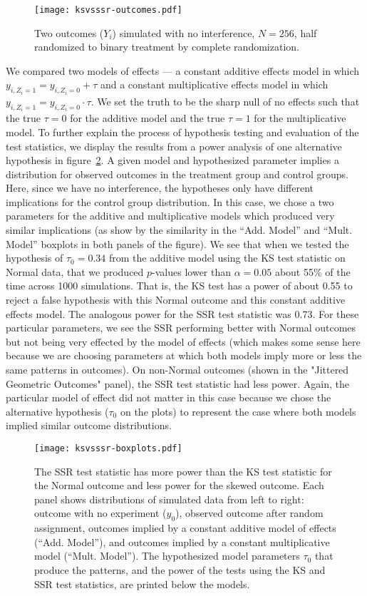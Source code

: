 \begin{figure}[H]\centering
  \texttt{[image: ksvsssr-outcomes.pdf]}
  \caption{Two outcomes ($Y_i$) simulated with no interference, $N=256$, half
    randomized to binary treatment by complete randomization. }\label{fig:simpleoutcomes}
\end{figure}

We compared two models of effects --- a constant additive effects model in
which $y_{i,Z_i=1}=y_{i,Z_i=0}+\tau$ and a constant multiplicative effects
model in which $y_{i,Z_i=1}=y_{i,Z_i=0} \cdot \tau$. We set the truth to be
the sharp null of no effects such that the true $\tau=0$ for the additive
model and the true $\tau=1$ for the multiplicative model. To further explain
the process of hypothesis testing and evaluation of the test statistics, we
display the results from a power analysis of one alternative hypothesis in
figure~\ref{fig:boxplot}. A given model and hypothesized parameter implies a
distribution for observed outcomes in the treatment group and control groups.
Here, since we have no interference, the hypotheses only have different
implications for the control group distribution. In this case, we chose a two
parameters for the additive and multiplicative models which produced very
similar implications (as show by the similarity in the ``Add. Model'' and
``Mult.  Model'' boxplots in both panels of the figure). We see that when we
tested the hypothesis of $\tau_0=0.34$ from the additive model using the KS
test statistic on Normal data, that we produced $p$-values lower than
$\alpha=0.05$ about 55\% of the time across 1000 simulations. That is, the KS
test has a power of about 0.55 to reject a false hypothesis with this Normal
outcome and this constant additive effects model. The analogous power for the
SSR test statistic was 0.73. For these particular parameters, we see the SSR
performing better with Normal outcomes but not being very effected by the
model of effects (which makes some sense here because we are choosing
parameters at which both models imply more or less the same patterns in
outcomes). On non-Normal outcomes (shown in the "Jittered Geometric Outcomes"
panel), the SSR test statistic had less power. Again, the particular model of
effect did not matter in this case because we chose the alternative hypothesis
($\tau_0$ on the plots) to represent the case where both models implied
similar outcome distributions.

\begin{figure}[H]\centering
  \texttt{[image: ksvsssr-boxplots.pdf]}
  \caption{The SSR test statistic has more power than the KS test statistic for the Normal outcome and
    less power for the skewed outcome. Each panel shows distributions of simulated data from left to right:
    outcome with no experiment ($y_0$), observed outcome after random assignment,
    outcomes implied by a constant additive model of effects (``Add. Model''),
    and outcomes implied by a constant multiplicative model (``Mult. Model''). The hypothesized model parameters $\tau_0$ that
    produce the patterns, and the power of the tests using the KS and SSR test
    statistics, are printed below the models.}\label{fig:boxplot}
\end{figure}


